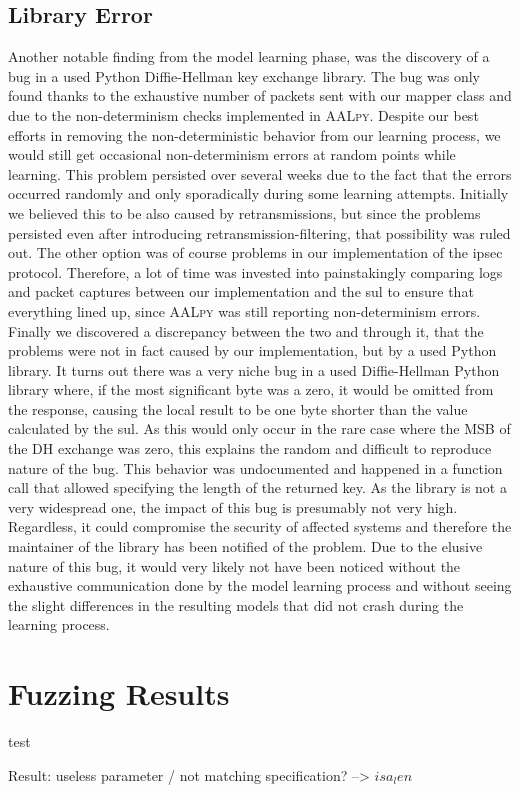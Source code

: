 \subsection{Library Error} \label{subsec:liberror}
Another notable finding from the model learning phase, was the discovery of a bug in a used Python Diffie-Hellman key exchange library. The bug was only found thanks to the exhaustive number of packets sent with our mapper class and due to the non-determinism checks implemented in \textsc{AALpy}. Despite our best efforts in removing the non-deterministic behavior from our learning process, we would still get occasional non-determinism errors at random points while learning. This problem persisted over several weeks due to the fact that the errors occurred randomly and only sporadically during some learning attempts. Initially we believed this to be also caused by retransmissions, but since the problems persisted even after introducing retransmission-filtering, that possibility was ruled out. The other option was of course problems in our implementation of the \ac{ipsec} protocol. Therefore, a lot of time was invested into painstakingly comparing logs and packet captures between our implementation and the \ac{sul} to ensure that everything lined up, since \textsc{AALpy} was still reporting non-determinism errors. Finally we discovered a discrepancy between the two and through it, that the problems were not in fact caused by our implementation, but by a used Python library. It turns out there was a very niche bug in a used Diffie-Hellman Python library where, if the most significant byte was a zero, it would be omitted from the response, causing the local result to be one byte shorter than the value calculated by the \ac{sul}. As this would only occur in the rare case where the MSB of the DH exchange was zero, this explains the random and difficult to reproduce nature of the bug. This behavior was undocumented and happened in a function call that allowed specifying the length of the returned key. As the library is not a very widespread one, the impact of this bug is presumably not very high. Regardless, it could compromise the security of affected systems and therefore the maintainer of the library has been notified of the problem. Due to the elusive nature of this bug, it would very likely not have been noticed without the exhaustive communication done by the model learning process and without seeing the slight differences in the resulting models that did not crash during the learning process.

\section{Fuzzing Results} \label{subsec:fuzzresults}
test

Result: useless parameter / not matching specification? --> $isa_len$